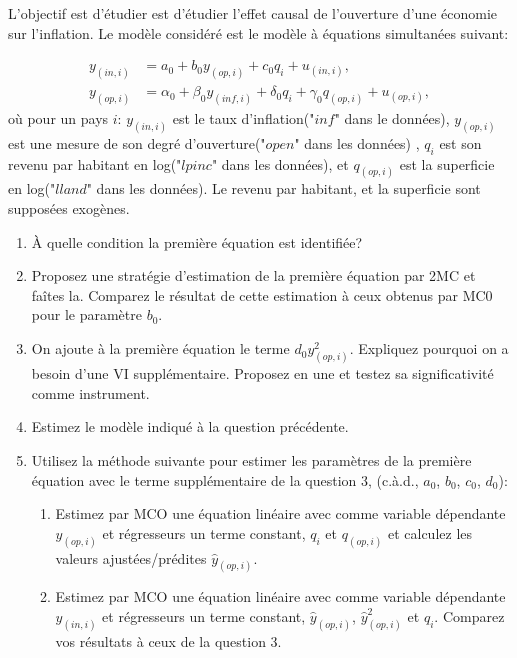L'objectif est d'étudier est d'étudier l'effet causal de l'ouverture d'une économie sur l'inflation. 
Le modèle considéré est le modèle à équations simultanées suivant:

\begin{align*}
	y_{(in,i)} &= a_0 + b_0 y_{(op, i)} + c_0 q_i + u_{(in,i)},\\
	y_{(op,i)} &= \alpha_0 + \beta_0 y_{(inf, i)} + \delta_0 q_i  + \gamma_0q_{(op, i)}+ u_{(op,i)},
\end{align*}
où pour un pays $i$: $y_{(in,i)}$ est le taux d'inflation("$inf$" dans le données), 
$y_{(op,i)}$ est une mesure de son degré d'ouverture("$open$" dans les données) , 
$q_i$ est son revenu par habitant en log("$lpinc$" dans les données), et $q_{(op, i)}$ 
est la superficie en log("$lland$" dans les données). Le revenu par habitant, et la superficie sont supposées exogènes.

\begin{enumerate}
\item À quelle condition la première équation est identifiée?
\item Proposez une stratégie d'estimation de la première équation par 2MC et faîtes la.
 Comparez le résultat de cette estimation à ceux obtenus par MC0 pour le paramètre $b_0$.
 \item On ajoute à la première équation le terme $d_0 y_{(op, i)}^2$. Expliquez 
 pourquoi on a besoin d'une VI supplémentaire. Proposez en une et testez sa significativité comme instrument.
 \item Estimez le modèle indiqué à la question précédente.
 \item Utilisez la méthode suivante pour estimer les paramètres de la première équation avec le terme supplémentaire de la question 3, (c.à.d., $a_0$, $b_0$, $c_0$, $d_0$): 
 \begin{enumerate}[label=(\roman*)]
 \item Estimez par MCO une équation linéaire avec comme variable dépendante $y_{(op,i)}$ et régresseurs un terme constant, $q_i$ et $q_{(op, i)}$ et calculez les valeurs ajustées/prédites $\hat{y}_{(op,i)}$.
 \item Estimez par MCO une équation linéaire avec comme variable dépendante $y_{(in,i)}$ et régresseurs un terme constant, $\hat{y}_{(op,i)}$, $\hat{y}_{(op,i)}^2$ et $q_i$. Comparez vos résultats à ceux de la question 3.
 \end{enumerate}
 
 
\end{enumerate}

